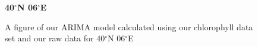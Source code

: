 \begin{figure}[H]
\centering
    \textbf{40$^{\circ}$N 06$^{\circ}$E}\par
            \caption{A figure of our ARIMA model calculated using our chlorophyll data set and our raw data for 40$^{\circ}$N 06$^{\circ}$E}
            \label{fig:MSts}
\end{figure}